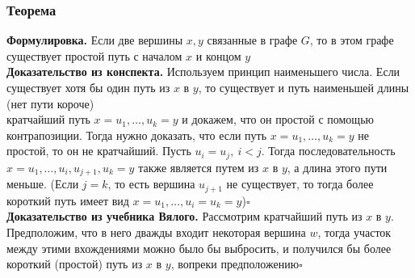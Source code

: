 \documentclass[a4paper]{article}
\begin{document}
\subsubsection*{Теорема}
\textbf{Формулировка.} Если две вершины $x,y$ связанные в графе $G$, то в этом графе существует простой путь с началом $x$ и концом $y$\\[2mm]
\indent\textbf{Доказательство из конспекта.} Используем принцип наименьшего числа. Если существует хотя бы один путь из $x$ в $y$, то существует и путь наименьшей длины (нет пути короче)\\[2mm]
 кратчайший путь $x=u_1,\ldots,u_k=y$ и докажем, что он простой с помощью контрапозиции. Тогда нужно доказать, что если путь $x=u_1,\ldots,u_k=y$ не простой, то он не кратчайший. Пусть $u_i=u_j,\ i<j$. Тогда последовательность $x=u_1,\ldots,u_i,u_{j+1},u_k=y$ также является путем из $x$ в $y$, а длина этого пути меньше. (Если $j = k$, то есть вершина $u_{j+1}$ не существует, то тогда более короткий путь имеет вид $x=u_1,\ldots,u_i=u_k=y$)\hfill$\square$\\[2mm]
\indent\textbf{Доказательство из учебника Вялого.} Рассмотрим кратчайший путь из $x$ в $y$. Предположим, что в него дважды входит некоторая вершина $w$, тогда участок между этими вхождениями можно было бы выбросить, и получился бы более короткий (простой) путь из $x$ в $y$, вопреки предположению\hfill$\square$
\label{2.1}
\end{document}
